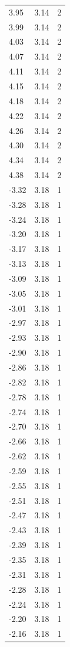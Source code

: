 \begin{longtable}{lrr}
  3.95 & 3.14 & 2 \\
  3.99 & 3.14 & 2 \\
  4.03 & 3.14 & 2 \\
  4.07 & 3.14 & 2 \\
  4.11 & 3.14 & 2 \\
  4.15 & 3.14 & 2 \\
  4.18 & 3.14 & 2 \\
  4.22 & 3.14 & 2 \\
  4.26 & 3.14 & 2 \\
  4.30 & 3.14 & 2 \\
  4.34 & 3.14 & 2 \\
  4.38 & 3.14 & 2 \\
  -3.32 & 3.18 & 1 \\
  -3.28 & 3.18 & 1 \\
  -3.24 & 3.18 & 1 \\
  -3.20 & 3.18 & 1 \\
  -3.17 & 3.18 & 1 \\
  -3.13 & 3.18 & 1 \\
  -3.09 & 3.18 & 1 \\
  -3.05 & 3.18 & 1 \\
  -3.01 & 3.18 & 1 \\
  -2.97 & 3.18 & 1 \\
  -2.93 & 3.18 & 1 \\
  -2.90 & 3.18 & 1 \\
  -2.86 & 3.18 & 1 \\
  -2.82 & 3.18 & 1 \\
  -2.78 & 3.18 & 1 \\
  -2.74 & 3.18 & 1 \\
  -2.70 & 3.18 & 1 \\
  -2.66 & 3.18 & 1 \\
  -2.62 & 3.18 & 1 \\
  -2.59 & 3.18 & 1 \\
  -2.55 & 3.18 & 1 \\
  -2.51 & 3.18 & 1 \\
  -2.47 & 3.18 & 1 \\
  -2.43 & 3.18 & 1 \\
  -2.39 & 3.18 & 1 \\
  -2.35 & 3.18 & 1 \\
  -2.31 & 3.18 & 1 \\
  -2.28 & 3.18 & 1 \\
  -2.24 & 3.18 & 1 \\
  -2.20 & 3.18 & 1 \\
  -2.16 & 3.18 & 1 \\

\end{longtable}
